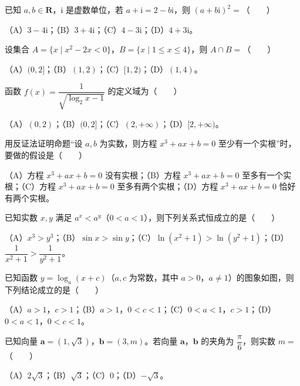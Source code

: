 \begin{question}
已知 $a,b\in\mathbf R$，$\mathrm i$ 是虚数单位，若 $a+\mathrm i=2-b\mathrm i$，则 $(a+b\mathrm i)^2=$\mbox{（　　）}

（A）$3-4\mathrm i$；（B）$3+4\mathrm i$；（C）$4-3\mathrm i$；（D）$4+3\mathrm i$。

\end{question}
\begin{question}
设集合 $A=\{x\mid x^2-2x<0\}$，$B=\{x\mid1\leqslant x\leqslant4\}$，则 $A\cap B=$\mbox{（　　）}

（A）$(0,2]$；（B）$(1,2)$；（C）$[1,2)$；（D）$(1,4)$。

\end{question}
\begin{question}
函数 $f(x)=\dfrac1{\sqrt{\log_2x-1}}$ 的定义域为\mbox{（　　）}

（A）$(0,2)$；（B）$(0,2]$；（C）$(2,+\infty)$；（D）$[2,+\infty)$。

\end{question}
\begin{question}
用反证法证明命题“设 $a,b$ 为实数，则方程 $x^3+ax+b=0$ 至少有一个实根”时，要做的假设是\mbox{（　　）}

（A）方程 $x^3+ax+b=0$ 没有实根；（B）方程 $x^3+ax+b=0$ 至多有一个实根；（C）方程 $x^3+ax+b=0$ 至多有两个实根；（D）方程 $x^3+ax+b=0$ 恰好有两个实根。

\end{question}
\begin{question}
已知实数 $x,y$ 满足 $a^x<a^y$（$0<a<1$），则下列关系式恒成立的是\mbox{（　　）}

（A）$x^3>y^3$；（B）$\sin x>\sin y$；（C）$\ln(x^2+1)>\ln(y^2+1)$；（D）$\dfrac1{x^2+1}>\dfrac1{y^2+1}$。

\Needspace{0.4\textheight}
\end{question}
\begin{question}
已知函数 $y=\log_a(x+c)$（$a,c$ 为常数，其中 $a>0$，$a\neq1$）的图象如图，则下列结论成立的是\mbox{（　　）}

（A）$a>1$，$c>1$；（B）$a>1$，$0<c<1$；（C）$0<a<1$，$c>1$；（D）$0<a<1$，$0<c<1$。
\nopagebreak[4]
\begin{center}\end{center}
\nopagebreak[4]
\end{question}
\begin{question}
已知向量 $\boldsymbol a=(1,\sqrt3)$，$\boldsymbol b=(3,m)$。若向量 $\boldsymbol a$，$\boldsymbol b$ 的夹角为 $\dfrac\pi6$，则实数 $m=$\mbox{（　　）}

（A）$2\sqrt3$；（B）$\sqrt3$；（C）$0$；（D）$-\sqrt3$。

\Needspace{0.4\textheight}
\end{question}
